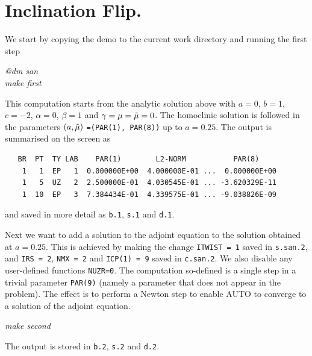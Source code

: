 \documentclass[12pt]{report}
\begin{document}
\section{Inclination Flip.}
We start by copying the demo to the current work directory 
and running the first step
\begin{center}
\it @dm san \\
make first
\end{center}
This computation starts from the analytic solution above with 
$a=0$, $b=1$, $c=-2$, $\alpha=0$, $\beta=1$ and 
$\gamma = \mu=\tilde \mu =0$. The homoclinic solution is followed in the
parameters $(a,\tilde \mu)$ {\tt =(PAR(1), PAR(8))} up to $a=0.25$. 
The output is summarised on the screen as
\begin{verbatim}
   BR  PT  TY LAB    PAR(1)        L2-NORM           PAR(8)     
    1   1  EP   1  0.000000E+00  4.000000E-01 ...  0.000000E+00
    1   5  UZ   2  2.500000E-01  4.030545E-01 ... -3.620329E-11
    1  10  EP   3  7.384434E-01  4.339575E-01 ... -9.038826E-09
\end{verbatim}
and saved in more detail as {\tt b.1}, {\tt s.1} and {\tt d.1}.

Next we want to add a solution to the adjoint equation to the
solution obtained at $a=0.25$. This is
achieved by making the change {\tt ITWIST = 1} saved in {\tt s.san.2},
and {\tt IRS = 2},  {\tt NMX = 2} and {\tt ICP(1) = 9} saved in 
{\tt c.san.2}. We also disable any
user-defined functions {\tt NUZR=0}. The computation so-defined 
is a single step in a trivial parameter {\tt PAR(9)} (namely a parameter
that does not appear in the problem). The effect is to perform a Newton
step to enable {\cal AUTO} to converge to a solution of the adjoint equation.
\begin{center}
{\it make second}
\end{center} 
The output is stored in {\tt b.2}, {\tt s.2}  and {\tt d.2}.
\end{document}
